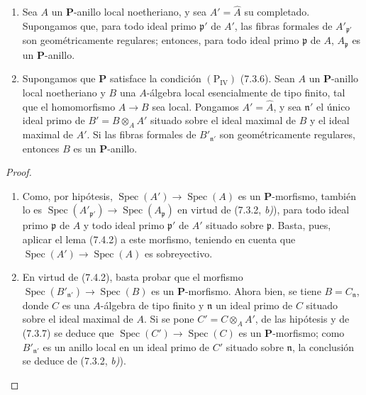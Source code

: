 \begin{corollary}[7.4.3]
\label{IV.2.s7.4.3-fr}
\begin{enumerate}
\item[\emph{(i)}] Sea $A$ un $\boldsymbol P$-anillo local
noetheriano, y sea $A'=\widehat A$ su completado. Supongamos que,
para todo ideal primo $\mathfrak p'$ de $A'$, las fibras formales de
$A'_{\mathfrak p'}$ son geométricamente regulares; entonces, para
todo ideal primo $\mathfrak p$ de $A$, $A_{\mathfrak p}$ es un
$\boldsymbol P$-anillo.
\item[\emph{(ii)}] Supongamos que $\boldsymbol P$ satisface la
condición $(\mathrm P_{\mathrm{IV}})$ \textup{(7.3.6)}. Sean $A$ un
$\boldsymbol P$-anillo local noetheriano y $B$ una $A$-álgebra
local esencialmente de tipo finito, tal que el homomorfismo
$A\to B$ sea local. Pongamos $A'=\widehat A$, y sea
$\mathfrak n'$ el único ideal primo de $B'=B\otimes_A A'$ situado
sobre el ideal maximal de $B$ y el ideal maximal de $A'$. Si las
fibras formales de $B'_{\mathfrak n'}$ son geométricamente regulares,
entonces $B$ es un $\boldsymbol P$-anillo.
\end{enumerate}
\end{corollary}

\begin{proof}
\begin{enumerate}
\item[(i)] Como, por hipótesis,
$\operatorname{Spec}(A')\to\operatorname{Spec}(A)$ es un
$\boldsymbol P$-morfismo, también lo es
$\operatorname{Spec}(A'_{\mathfrak p'})\to
\operatorname{Spec}(A_{\mathfrak p})$ en virtud de (7.3.2, \emph{b)}),
para todo ideal primo $\mathfrak p$ de $A$ y todo ideal primo
$\mathfrak p'$ de $A'$ situado sobre $\mathfrak p$. Basta, pues,
aplicar el lema (7.4.2) a este morfismo, teniendo en cuenta que
$\operatorname{Spec}(A')\to\operatorname{Spec}(A)$ es sobreyectivo.
\item[(ii)] En virtud de (7.4.2), basta probar que el
morfismo
$\operatorname{Spec}(B'_{\mathfrak n'})\to\operatorname{Spec}(B)$
es un $\boldsymbol P$-morfismo. Ahora bien, se tiene
$B=C_{\mathfrak n}$, donde $C$ es una $A$-álgebra de tipo finito y
$\mathfrak n$ un ideal primo de $C$ situado sobre el ideal maximal
de $A$. Si se pone $C'=C\otimes_A A'$, de las hipótesis y de
(7.3.7) se deduce que
$\operatorname{Spec}(C')\to\operatorname{Spec}(C)$ es un
$\boldsymbol P$-morfismo; como $B'_{\mathfrak n'}$ es un anillo
local en un ideal primo de $C'$ situado sobre $\mathfrak n$, la
conclusión se deduce de (7.3.2, \emph{b)}).
\end{enumerate}
\end{proof}
